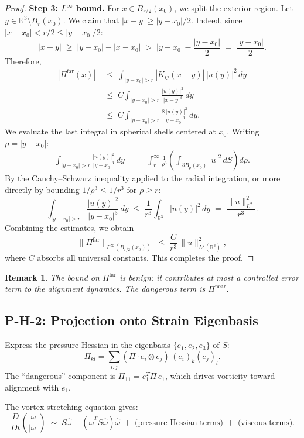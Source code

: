 \documentclass[11pt]{article}
\newtheorem{remark}[lemma]{Remark}
\theoremstyle{definition}
\begin{document}
\begin{proof}
\textbf{Step 3: $L^\infty$ bound.}
For $x \in B_{r/2}(x_0)$, we split the exterior region.  Let $y \in \mathbb{R}^3 \setminus B_r(x_0)$.  We claim that $|x - y| \geq |y - x_0|/2$.  Indeed, since $|x - x_0| < r/2 \leq |y - x_0|/2$:
\[
  |x - y| \;\geq\; |y - x_0| - |x - x_0| \;>\; |y - x_0| - \frac{|y-x_0|}{2} \;=\; \frac{|y-x_0|}{2}.
\]
Therefore,
\begin{align*}
  |\Pi^{\mathrm{far}}(x)|
  &\;\leq\;
  \int_{|y-x_0|>r} |K_{ij}(x-y)|\,|u(y)|^2\,dy \\
  &\;\leq\;
  C \int_{|y-x_0|>r} \frac{|u(y)|^2}{|x-y|^3}\,dy \\
  &\;\leq\;
  C \int_{|y-x_0|>r} \frac{8\,|u(y)|^2}{|y-x_0|^3}\,dy.
\end{align*}
We evaluate the last integral in spherical shells centered at $x_0$.  Writing $\rho = |y - x_0|$:
\begin{align*}
  \int_{|y-x_0|>r} \frac{|u(y)|^2}{|y-x_0|^3}\,dy
  &\;=\;
  \int_r^\infty \frac{1}{\rho^3} \left(\int_{\partial B_\rho(x_0)} |u|^2\,dS\right) d\rho.
\end{align*}
By the Cauchy--Schwarz inequality applied to the radial integration, or more directly by bounding $1/\rho^3 \leq 1/r^3$ for $\rho \geq r$:
\[
  \int_{|y-x_0|>r} \frac{|u(y)|^2}{|y-x_0|^3}\,dy
  \;\leq\;
  \frac{1}{r^3}\int_{\mathbb{R}^3} |u(y)|^2\,dy
  \;=\;
  \frac{\|u\|_{L^2}^2}{r^3}.
\]
Combining the estimates, we obtain
\[
  \|\Pi^{\mathrm{far}}\|_{L^\infty(B_{r/2}(x_0))}
  \;\leq\;
  \frac{C}{r^3}\,\|u\|_{L^2(\mathbb{R}^3)}^2,
\]
where $C$ absorbs all universal constants.  This completes the proof.
\end{proof}

\begin{remark}
The bound on $\Pi^{\mathrm{far}}$ is benign: it contributes at most a controlled error term to the alignment dynamics.  The dangerous term is $\Pi^{\mathrm{near}}$.
\end{remark}

\subsection{P-H-2: Projection onto Strain Eigenbasis}

Express the pressure Hessian in the eigenbasis $\{e_1, e_2, e_3\}$ of $S$:
\[
  \Pi_{kl} = \sum_{i,j} (\Pi \cdot e_i \otimes e_j)\, (e_i)_k (e_j)_l.
\]
The ``dangerous'' component is $\Pi_{11} = e_1^T \Pi\, e_1$, which drives vorticity toward alignment with $e_1$.

The vortex stretching equation gives:
\[
  \frac{D}{Dt}\left(\frac{\omega}{|\omega|}\right) \;\sim\; S\hat{\omega} - (\hat{\omega}^T S \hat{\omega})\hat{\omega}
  \;+\; \text{(pressure Hessian terms)} \;+\; \text{(viscous terms)}.
\]
\end{document}
